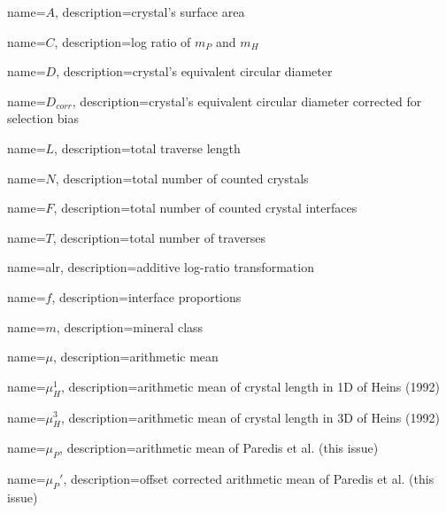 





{
    name={\ensuremath{A}},
    description={crystal's surface area}
}

{
    name={\ensuremath{C}},
    description={log ratio of \(m_{P}\) and \(m_{H}\)}
}

{
    name={\ensuremath{D}},
    description={crystal's equivalent circular diameter}
}

{
    name={\ensuremath{D_{corr}}},
    description={crystal's equivalent circular diameter corrected for selection bias}
}

{
    name={\ensuremath{L}},
    description={total traverse length}
}

{
    name={\ensuremath{N}},
    description={total number of counted crystals}
}

{
    name={\ensuremath{F}},
    description={total number of counted crystal interfaces}
}

{
    name={\ensuremath{T}},
    description={total number of traverses}
}

{
    name={alr},
    description={additive log-ratio transformation}
}

{
    name=\ensuremath{f},
    description={interface proportions}
}

{
    name={\ensuremath{m}},
    description={mineral class}
}


{
    name={\ensuremath{\mu}},
    description={arithmetic mean}
}

{
    name={\ensuremath{\mu_{H}^{1}}},
    description={arithmetic mean of crystal length in 1D of Heins (1992)}
}

{
    name={\ensuremath{\mu_{H}^{3}}},
    description={arithmetic mean of crystal length in 3D of Heins (1992)}
}

{
    name={\ensuremath{\mu_{P}}},
    description={arithmetic mean of Paredis et al. (this issue)}
}

{
    name={\ensuremath{\mu_{P}'}},
    description={offset corrected arithmetic mean of Paredis et al. (this issue)}
}


